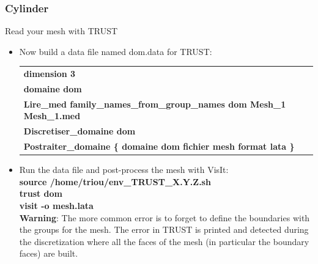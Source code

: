 \documentclass[10pt, hyperref={unicode=true,pdfusetitle, bookmarks=true,bookmarksnumbered=false,bookmarksopen=false, breaklinks=false,pdfborder={0 0 1},backref=true,colorlinks=true,linkcolor=darkblue,pageanchor}]{beamer}
\begin{document}
\begin{frame}
\frametitle{Cylinder}
\begin{block}{Read your mesh with TRUST}

\begin{itemize}
\item \label{read_mesh} Now build a data file named dom.data for TRUST:\\
\vspace{0.2cm}
\begin{tabular}{|l|}
\hline 
\textbf{dimension 3 }\tabularnewline
\textbf{domaine dom }\tabularnewline
\textbf{Lire\_med family\_names\_from\_group\_names dom Mesh\_1 Mesh\_1.med }\tabularnewline
\textbf{Discretiser\_domaine\index{discretiser\_domaine} dom }\tabularnewline
\textbf{Postraiter\_domaine\index{Postraiter\_domaine} \{ domaine dom fichier mesh format lata\index{format lata}
\}}\tabularnewline
\hline 
\end{tabular}

\item Run the data file and post-process the mesh with VisIt:\\
\textbf{source  /home/triou/env\_TRUST\_X.Y.Z.sh} \\
\textbf{trust dom} \\
\textbf{visit -o mesh.lata} \\
\vspace{0.2cm}
\textbf{Warning}: The more common error is to forget to define the boundaries with the groups for the mesh. The error in TRUST is printed and detected during the discretization where all the faces of the mesh (in particular the boundary faces) are built.

\end{itemize}

\end{block}
\end{frame}
\end{document}
